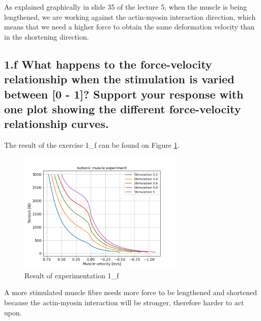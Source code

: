 \documentclass{cmc}
\begin{document}
    As explained graphically in slide 35 of the lecture 5, when the muscle is being lengthened, we are working against the actin-myosin interaction direction, which means that we need a higher force to obtain the same deformation velocity than in the shortening direction.

\subsection*{1.f What happens to the force-velocity relationship
  when the stimulation is varied between [0 - 1]? Support your
  response with one plot showing the different force-velocity
  relationship curves.  }
  
    
    The result of the exercise 1\_f can be found on Figure \ref{fig:ex_1f}.
    
    \begin{figure}[H]
      \centering \includegraphics[width=0.7\textwidth]{figures/1f.png}
      \caption{\label{fig:ex_1f} Result of experimentation 1\_f}
    \end{figure}
    
    A more stimulated muscle fibre needs more force to be lengthened and shortened because the actin-myosin interaction will be stronger, therefore harder to act upon.
    
\end{document}
